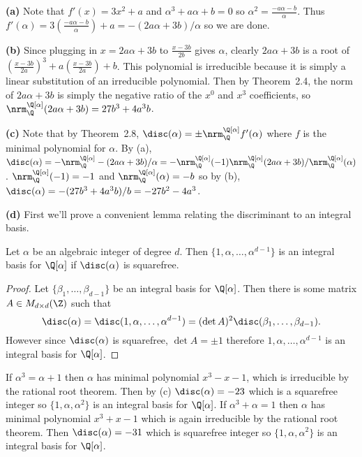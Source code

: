 \documentclass[11pt,letterpaper]{article}
\begin{document}
\begin{solution}
    \textbf{(a)} Note that $f'(x)=3x^2+a$ and $\alpha^3+a\alpha+b=0$ so $\alpha^2=\frac{-a\alpha-b}{\alpha}$. Thus $f'(\alpha)=3\left(\frac{-a\alpha-b}{\alpha}\right)+a=-(2a\alpha+3b) /\alpha$ so we are done.

    \textbf{(b)} Since plugging in $x=2a\alpha+3b$ to $\frac{x-3b}{2b}$ gives $\alpha$, clearly $2a\alpha+3b$ is a root of $\left(\frac{x-3b}{2a}\right)^3+a\left(\frac{x-3b}{2a}\right)+b$. This polynomial is irreducible because it is simply a linear substitution of an irreducible polynomial. Then by Theorem~2.4, the norm of $2a\alpha+3b$ is simply the negative ratio of the $x^0$ and $x^3$ coefficients, so $\nrm^{\Q[\alpha]}_{\Q}(2a\alpha+3b)=27b^3+4a^3b$.
    
    \textbf{(c)} Note that by Theorem~2.8, $\disc(\alpha)=\pm \nrm^{\Q[\alpha]}_\Q f'(\alpha)$ where $f$ is the minimal polynomial for $\alpha$. By (a), $\disc(\alpha)= -\nrm^{\Q[\alpha]}_\Q-(2a\alpha+3b) /\alpha = -\nrm^{\Q[\alpha]}_\Q(-1)\nrm^{\Q[\alpha]}_\Q(2a\alpha+3b) / \nrm^{\Q[\alpha]}_\Q(\alpha)$. $\nrm^{\Q[\alpha]}_\Q(-1)=-1$ and $\nrm^{\Q[\alpha]}_\Q(\alpha)=-b$ so by (b), $\disc(\alpha)=-(27b^3+4a^3b) /b=-27b^2-4a^3$.   
    
    \textbf{(d)} First we'll prove a convenient lemma relating the discriminant to an integral basis.
    \begin{claim}
        Let $\alpha$ be an algebraic integer of degree $d$. Then $\{1,\alpha,\ldots,\alpha^{d-1}\}$ is an integral basis for $\Q[\alpha]$ if $\disc(\alpha)$ is squarefree. 
    \end{claim}
    \begin{proof}
        Let $\{\beta_1,\ldots,\beta_{d-1}\}$ be an integral basis for $\Q[\alpha]$. Then there is some matrix $A\in M_{d\times d}(\Z)$ such that
        \[
            \disc(\alpha)=\disc(1,\alpha,\ldots,\alpha^{d-1})=(\det A)^2\disc(\beta_1,\ldots,\beta_{d-1})
        .\] 
        However since $\disc(\alpha)$ is squarefree, $\det A=\pm 1$ therefore $1,\alpha,\ldots,\alpha^{d-1}$ is an integral basis for $\Q[\alpha]$. 
    \end{proof}
    
    If $\alpha^3=\alpha+1$ then $\alpha$ has minimal polynomial $x^3-x-1$, which is irreducible by the rational root theorem. Then by (c) $\disc(\alpha)=-23$ which is a squarefree integer so $\{1,\alpha,\alpha^2\}$ is an integral basis for $\Q[\alpha]$. If $\alpha^3+\alpha=1$ then $\alpha$ has minimal polynomial $x^3+x-1$ which is again irreducible by the rational root theorem. Then $\disc(\alpha)=-31$ which is squarefree integer so $\{1,\alpha,\alpha^2\}$ is an integral basis for $\Q[\alpha]$.
\end{solution}
\end{document}
